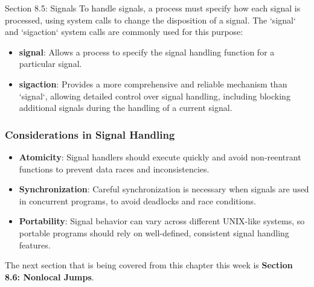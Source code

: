 \begin{notes}{Section 8.5: Signals}
    To handle signals, a process must specify how each signal is processed, using system calls to change the disposition of a signal. The `signal` and `sigaction` system calls are commonly used for this purpose:
    
    \begin{itemize}
        \item \textbf{signal}: Allows a process to specify the signal handling function for a particular signal.
        \item \textbf{sigaction}: Provides a more comprehensive and reliable mechanism than `signal`, allowing detailed control over signal handling, including blocking additional signals during the 
        handling of a current signal.
    \end{itemize}
    
    \subsubsection*{Considerations in Signal Handling}
    
    \begin{itemize}
        \item \textbf{Atomicity}: Signal handlers should execute quickly and avoid non-reentrant functions to prevent data races and inconsistencies.
        \item \textbf{Synchronization}: Careful synchronization is necessary when signals are used in concurrent programs, to avoid deadlocks and race conditions.
        \item \textbf{Portability}: Signal behavior can vary across different UNIX-like systems, so portable programs should rely on well-defined, consistent signal handling features.
    \end{itemize}    
\end{notes}

The next section that is being covered from this chapter this week is \textbf{Section 8.6: Nonlocal Jumps}.

